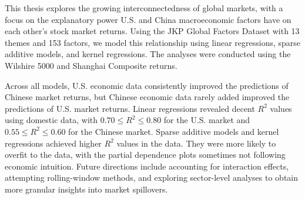This thesis explores the growing interconnectedness of global markets, with a focus on the explanatory power U.S. and China macroeconomic factors have on each other's stock market returns. Using the JKP Global Factors Dataset with 13 themes and 153 factors, we model this relationship using linear regressions, sparse additive models, and kernel regressions. The analyses were conducted using the Wilshire 5000 and Shanghai Composite returns. 

Across all models, U.S. economic data consistently improved the predictions of Chinese market returns, but Chinese economic data rarely added improved the predictions of U.S. market returns. Linear regressions revealed decent $R^2$ values using domestic data, with $0.70\leq R^2\leq 0.80$ for the U.S. market and $0.55\leq R^2\leq 0.60$ for the Chinese market. Sparse additive models and kernel regressions achieved higher $R^2$ values in the data. They were more likely to overfit to the data, with the partial dependence plots sometimes not following economic intuition. Future directions include accounting for interaction effects, attempting rolling-window methods, and exploring sector-level analyses to obtain more granular insights into market spillovers.